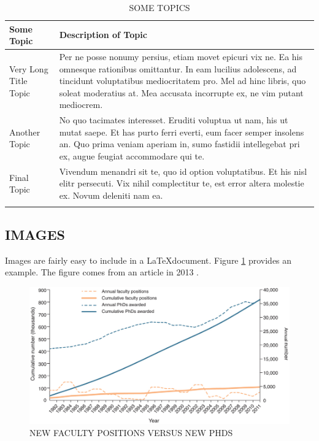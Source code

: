 \documentclass[main.tex]{subfiles}
\begin{document}
        \begin{longtable}{p{3cm}p{11cm}}
                \toprule%
                 \centering%
                 {\bfseries Some Topic}
                 & {\bfseries Description of Topic} \\
                
                \cmidrule[0.4pt](r{0.125em}){1-1}%
                \cmidrule[0.4pt](lr{0.125em}){2-2}%
                \endhead
                
                Very Long Title Topic & Per ne posse nonumy persius, etiam movet epicuri 
                vix ne. Ea his omnesque rationibus omittantur. In eam lucilius adolescens, 
                ad tincidunt voluptatibus mediocritatem pro. Mel ad hinc libris, quo 
                soleat moderatius at. Mea accusata incorrupte ex, ne vim putant mediocrem. \\
                \myrowcolour%
                Another Topic & No quo tacimates interesset. Eruditi voluptua ut nam, 
                his ut mutat saepe. Et has purto ferri everti, eum facer semper insolens 
                an. Quo prima veniam aperiam in, sumo fastidii intellegebat pri ex, 
                augue feugiat accommodare qui te. \\
                Final Topic & Vivendum menandri sit te, quo id option voluptatibus. 
                Et his nisl elitr persecuti. Vix nihil complectitur te, est error 
                altera molestie ex. Novum deleniti nam ea.  \\
                
                \bottomrule
                
                \caption{SOME TOPICS}
                \label{tab:topics}
            \end{longtable}
            
    \subsection{IMAGES}
        Images are fairly easy to include in a \LaTeX document.  
        Figure \ref{fig:facvsphd} provides an example.  The figure comes from
        an article in 2013 \cite{Schillebeeckx2013}.
        
        \begin{figure}[ht]
            \centering
            \includegraphics[scale=.4]{images/facultyVsPhd.jpg}
            \caption{NEW FACULTY POSITIONS VERSUS NEW PHDS}
            \label{fig:facvsphd}
        \end{figure}
    
\end{document}
